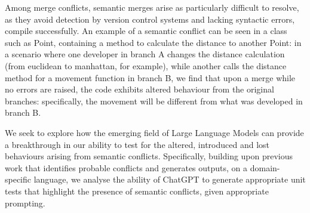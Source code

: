 Among merge conflicts, semantic merges arise as particularly difficult to resolve, as they avoid detection by version control systems and lacking syntactic errors, compile successfully. An example of a semantic conflict can be seen in a class such as Point, containing a method to calculate the distance to another Point: in a scenario where one developer in branch A changes the distance calculation (from euclidean to manhattan, for example), while another calls the distance method for a movement function in branch B, we find that upon a merge while no errors are raised, the code exhibits altered behaviour from the original branches: specifically, the movement will be different from what was developed in branch B.

We seek to explore how the emerging field of Large Language Models can provide a breakthrough in our ability to test for the altered, introduced and lost behaviours arising from semantic conflicts. Specifically, building upon previous work that identifies probable conflicts and generates outputs, on a domain-specific language, we analyse the ability of ChatGPT to generate appropriate unit tests that highlight the presence of semantic conflicts, given appropriate prompting.
